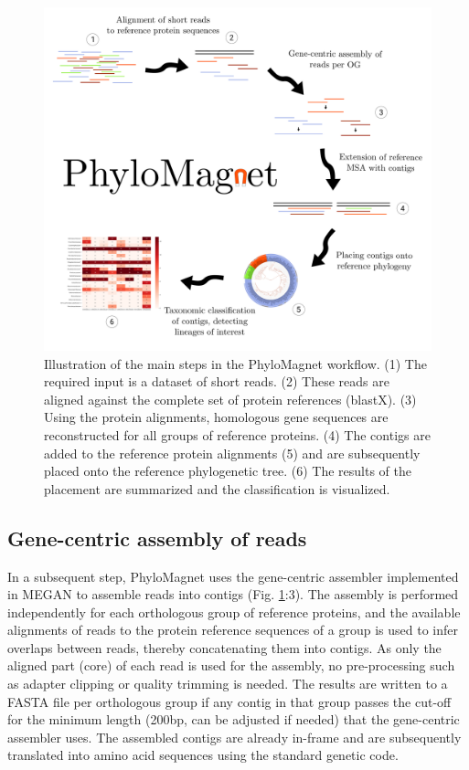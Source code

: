 \documentclass[a4paper]{article}
\begin{document}
\begin{figure}[!tpb]
\centerline{\includegraphics[width=.9\textwidth]{Fig1.pdf}}
\caption{Illustration of the main steps in the PhyloMagnet workflow. (1) The required input is a dataset of short reads. (2) These reads are aligned against the complete set of protein references (blastX). (3) Using the protein alignments, homologous gene sequences are reconstructed for all groups of reference proteins. (4) The contigs are added to the reference protein alignments (5) and are subsequently placed onto the reference phylogenetic tree. (6) The results of the placement are summarized and the classification is visualized.}\label{fig:01}
\end{figure}


\subsection{Gene-centric assembly of reads}\label{gc-assembly}
In a subsequent step, PhyloMagnet uses the gene-centric assembler implemented in MEGAN \citep{Huson2016,Huson2017} to assemble reads into contigs (Fig. \ref{fig:01}:3). The assembly is performed independently for each orthologous group of reference proteins, and the available alignments of reads to the protein reference sequences of a group is used to infer overlaps between reads, thereby concatenating them into contigs. As only the aligned part (core) of each read is used for the assembly, no pre-processing such as adapter clipping or quality trimming is needed. The results are written to a FASTA file per orthologous group if any contig in that group passes the cut-off for the minimum length (200bp, can be adjusted if needed) that the gene-centric assembler uses. The assembled contigs are already in-frame and are subsequently translated into amino acid sequences using the standard genetic code.
\end{document}
